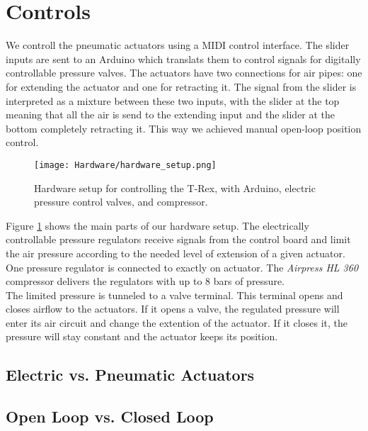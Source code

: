 \section{Controls}
We controll the pneumatic actuators using a MIDI control interface. The slider inputs are sent to an Arduino which translats them to control signals for digitally controllable pressure valves. The actuators have two connections for air pipes: one for extending the actuator and one for retracting it. The signal from the slider is interpreted as a mixture between these two inputs, with the slider at the top meaning that all the air is send to the extending input and the slider at the bottom completely retracting it. This way we achieved manual open-loop position control.\\
\begin{figure}[h!]
    \texttt{[image: Hardware/hardware\_setup.png]}
    \centering
    \caption{Hardware setup for controlling the T-Rex, with Arduino, electric pressure control valves, and compressor.}
    \label{fig:hardware_setup}
\end{figure}
Figure \ref{fig:hardware_setup} shows the main parts of our hardware setup. The electrically controllable pressure regulators receive signals from the control board and limit the air pressure according to the needed level of extension of a given actuator. One pressure regulator is connected to exactly on actuator. The \textit{Airpress HL 360} compressor delivers the regulators with up to 8 bars of pressure.\\
The limited pressure is tunneled to a valve terminal. This terminal opens and closes airflow to the actuators. If it opens a valve, the regulated pressure will enter its air circuit and change the extention of the actuator. If it closes it, the pressure will stay constant and the actuator keeps its position.

\subsection{Electric vs. Pneumatic Actuators}

\subsection{Open Loop vs. Closed Loop}
